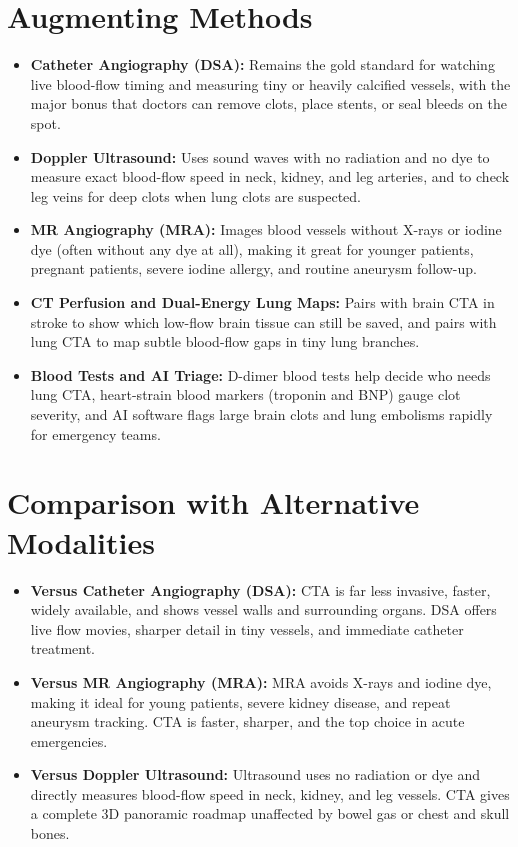 \section{Augmenting Methods}
\begin{itemize}
    \item \textbf{Catheter Angiography (DSA):} Remains the gold standard for watching live blood-flow timing and measuring tiny or heavily calcified vessels, with the major bonus that doctors can remove clots, place stents, or seal bleeds on the spot.
    \item \textbf{Doppler Ultrasound:} Uses sound waves with no radiation and no dye to measure exact blood-flow speed in neck, kidney, and leg arteries, and to check leg veins for deep clots when lung clots are suspected.
    \item \textbf{MR Angiography (MRA):} Images blood vessels without X-rays or iodine dye (often without any dye at all), making it great for younger patients, pregnant patients, severe iodine allergy, and routine aneurysm follow-up.
    \item \textbf{CT Perfusion and Dual-Energy Lung Maps:} Pairs with brain CTA in stroke to show which low-flow brain tissue can still be saved, and pairs with lung CTA to map subtle blood-flow gaps in tiny lung branches.
    \item \textbf{Blood Tests and AI Triage:} D-dimer blood tests help decide who needs lung CTA, heart-strain blood markers (troponin and BNP) gauge clot severity, and AI software flags large brain clots and lung embolisms rapidly for emergency teams.
\end{itemize}

\section{Comparison with Alternative Modalities}
\begin{itemize}
    \item \textbf{Versus Catheter Angiography (DSA):} CTA is far less invasive, faster, widely available, and shows vessel walls and surrounding organs. DSA offers live flow movies, sharper detail in tiny vessels, and immediate catheter treatment.
    \item \textbf{Versus MR Angiography (MRA):} MRA avoids X-rays and iodine dye, making it ideal for young patients, severe kidney disease, and repeat aneurysm tracking. CTA is faster, sharper, and the top choice in acute emergencies.
    \item \textbf{Versus Doppler Ultrasound:} Ultrasound uses no radiation or dye and directly measures blood-flow speed in neck, kidney, and leg vessels. CTA gives a complete 3D panoramic roadmap unaffected by bowel gas or chest and skull bones.
\end{itemize}

